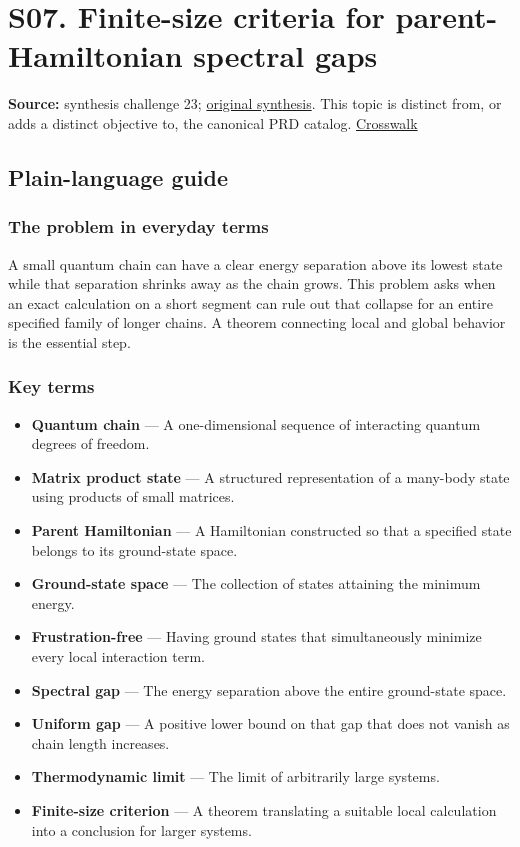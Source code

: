 \documentclass[
  11pt,
]{article}
\begin{document}
\section{S07. Finite-size criteria for parent-Hamiltonian spectral gaps}

\textbf{Source:} synthesis challenge 23;
\href{https://github.com/rick-stevens-ai/Pure-Thought/blob/main/NOTES/30-Most-Compelling-Pure-Thought-AI-Challenges.md}{original
synthesis}. This topic is distinct from, or adds a distinct objective
to, the canonical PRD catalog.
\href{https://github.com/rick-stevens-ai/Pure-Thought/blob/main/reviews/SYNTHESIS-CROSSWALK.md}{Crosswalk}

\subsection{Plain-language guide}

\subsubsection{The problem in everyday terms}

A small quantum chain can have a clear energy separation above its
lowest state while that separation shrinks away as the chain grows. This
problem asks when an exact calculation on a short segment can rule out
that collapse for an entire specified family of longer chains. A theorem
connecting local and global behavior is the essential step.

\subsubsection{Key terms}

\begin{itemize}
\item
  \textbf{Quantum chain} --- A one-dimensional sequence of interacting
  quantum degrees of freedom.
\item
  \textbf{Matrix product state} --- A structured representation of a
  many-body state using products of small matrices.
\item
  \textbf{Parent Hamiltonian} --- A Hamiltonian constructed so that a
  specified state belongs to its ground-state space.
\item
  \textbf{Ground-state space} --- The collection of states attaining the
  minimum energy.
\item
  \textbf{Frustration-free} --- Having ground states that simultaneously
  minimize every local interaction term.
\item
  \textbf{Spectral gap} --- The energy separation above the entire
  ground-state space.
\item
  \textbf{Uniform gap} --- A positive lower bound on that gap that does
  not vanish as chain length increases.
\item
  \textbf{Thermodynamic limit} --- The limit of arbitrarily large
  systems.
\item
  \textbf{Finite-size criterion} --- A theorem translating a suitable
  local calculation into a conclusion for larger systems.
\end{itemize}
\end{document}

